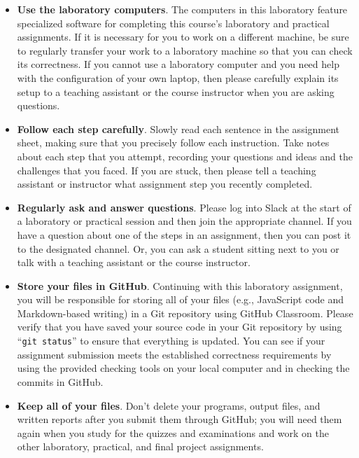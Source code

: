 \documentclass[11pt]{article}
\newcommand{\command}[1]{``\lstinline{#1}''}
\begin{document}
\begin{itemize} \setlength{\itemsep}{0pt}

\item {\bf Use the laboratory computers}. The computers in this laboratory
  feature specialized software for completing this course's laboratory and
  practical assignments. If it is necessary for you to work on a different
  machine, be sure to regularly transfer your work to a laboratory machine so
  that you can check its correctness. If you cannot use a laboratory computer
  and you need help with the configuration of your own laptop, then please
  carefully explain its setup to a teaching assistant or the course instructor
  when you are asking questions.

\item {\bf Follow each step carefully}. Slowly read each sentence in the
  assignment sheet, making sure that you precisely follow each instruction. Take
  notes about each step that you attempt, recording your questions and ideas and
  the challenges that you faced. If you are stuck, then please tell a teaching
  assistant or instructor what assignment step you recently completed.

\item {\bf Regularly ask and answer questions}. Please log into Slack at the
  start of a laboratory or practical session and then join the appropriate
  channel. If you have a question about one of the steps in an assignment, then
  you can post it to the designated channel. Or, you can ask a student sitting
  next to you or talk with a teaching assistant or the course instructor.

\item {\bf Store your files in GitHub}. Continuing with this laboratory
  assignment, you will be responsible for storing all of your files (e.g.,
  JavaScript code and Markdown-based writing) in a Git repository using GitHub
  Classroom. Please verify that you have saved your source code in your Git
  repository by using \command{git status} to ensure that everything is updated.
  You can see if your assignment submission meets the established correctness
  requirements by using the provided checking tools on your local computer and
  in checking the commits in GitHub.

\item {\bf Keep all of your files}. Don't delete your programs, output files,
  and written reports after you submit them through GitHub; you will need them
  again when you study for the quizzes and examinations and work on the other
  laboratory, practical, and final project assignments.


\end{itemize}
\end{document}
